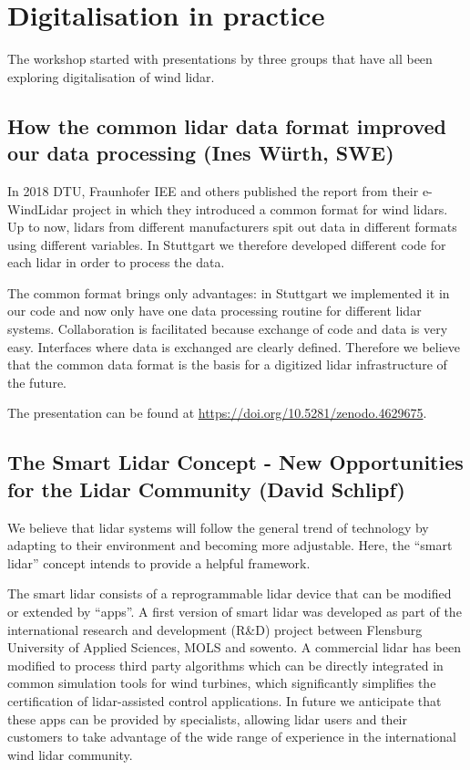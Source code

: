 \section{Digitalisation in practice}

The workshop started with presentations by three groups that have all been exploring digitalisation of wind lidar.

\subsection{How the common lidar data format improved our data processing (Ines Würth, SWE)}

In 2018 DTU, Fraunhofer IEE and others published the report from their e-WindLidar project \citep{nikola_vasiljevic_2018_2478051} in which they introduced a common format for wind lidars. Up to now, lidars from different manufacturers spit out data in different formats using different variables. In Stuttgart we therefore developed different code for each lidar in order to process the data.

The common format brings only advantages: in Stuttgart we implemented it in our code and now only have one data processing routine for different lidar systems. Collaboration is facilitated because exchange of code and data is very easy. Interfaces where data is exchanged are clearly defined. Therefore we believe that the common data format is the basis for a digitized lidar infrastructure of the future.

The presentation can be found at \href{https://doi.org/10.5281/zenodo.4629675}{https://doi.org/10.5281/zenodo.4629675}.

\subsection{The Smart Lidar Concept - New Opportunities for the Lidar Community (David Schlipf)}

We believe that lidar systems will follow the general trend of technology by adapting to their environment and becoming more adjustable. Here, the “smart lidar” concept intends to provide a helpful framework. 

The smart lidar consists of a reprogrammable lidar device that can be modified or extended by “apps”. A first version of smart lidar was developed as part of the international research and development (R\&D) project between Flensburg University of Applied Sciences, MOLS and sowento. A commercial lidar has been modified to process third party algorithms which can be directly integrated in common simulation tools for wind turbines, which significantly simplifies the certification of lidar-assisted control applications. In future we anticipate that these apps can be provided by specialists, allowing lidar users and their customers to take advantage of the wide range of experience in the international wind lidar community. 

